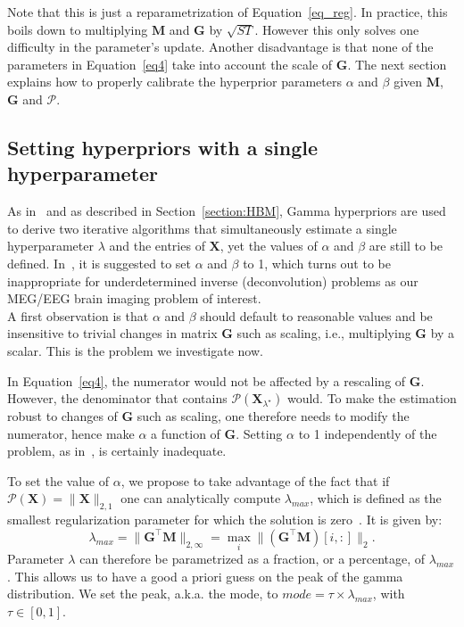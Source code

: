 Note that this is just a reparametrization of Equation~\eqref{eq_reg}. In practice, this boils down to multiplying $\mathbf{M}$ and $\mathbf{G}$ by $\sqrt{ST}$. However this only solves one difficulty in the parameter's update. Another disadvantage is that none of the parameters in Equation~\eqref{eq4} take into account the scale of $\mathbf{G}$. The next section explains how to properly calibrate the hyperprior parameters $\alpha$ and $\beta$ given $\mathbf{M}$, $\mathbf{G}$ and $\mathcal{P}$.

\subsection{Setting hyperpriors with a single hyperparameter}
As in~\cite{Figueiredo} and as described in Section~\ref{section:HBM}, Gamma hyperpriors are used to derive two iterative algorithms that simultaneously estimate a single hyperparameter $\lambda$ and the entries of $\mathbf{X}$, yet the values of $\alpha$ and $\beta$ are still to be defined.
In~\cite{Figueiredo}, it is suggested to set $\alpha$ and $\beta$ to 1, which turns out to be inappropriate for underdetermined inverse (deconvolution) problems as our MEG/EEG brain imaging problem of interest.\\

A first observation is that $\alpha$ and $\beta$ should default to reasonable values and be insensitive to trivial changes in matrix $\mathbf{G}$ such as scaling, i.e., multiplying $\mathbf{G}$ by a scalar. This is the problem we investigate now.

In Equation~\eqref{eq4}, the numerator would not be affected by a rescaling of $\mathbf{G}$. However, the denominator that contains $\mathcal{P}(\mathbf{X}_{\lambda^\star})$ would. To make the estimation robust to changes of $\mathbf{G}$ such as scaling, one therefore needs to modify the numerator, hence make $\alpha$ a function of $\mathbf{G}$. Setting $\alpha$ to 1 independently of the problem, as in~\cite{Figueiredo}, is certainly inadequate.

To set the value of $\alpha$, we propose to take advantage of the fact that if $\mathcal{P}(\mathbf{X})=\|\mathbf{X}\|_{2,1}$ one can analytically compute $\lambda_{max}$, which is defined as the smallest regularization parameter for which the solution is zero~\cite{bach2012optimization}. It is given by:
\begin{equation}
\lambda_{max} = \|\mathbf{G}^\top\mathbf{M}\|_{2,\infty}=\max_i \|(\mathbf{G}^\top\mathbf{M})[i, :]\|_2.
\end{equation}
Parameter $\lambda$ can therefore be parametrized as a fraction, or a percentage, of $\lambda_{max}$.
This allows us to have a good a priori guess on the peak of the gamma distribution. We set the peak, a.k.a. the mode, to $mode=\tau\times\lambda_{max}$, with $\tau\in[0,1]$.
\\

